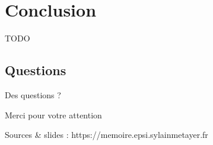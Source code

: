 \section{Conclusion}
\begin{frame}{\secname}
TODO
\end{frame}

\subsection{Questions}
\begin{frame}{Des questions ?}

Merci pour votre attention

Sources \& slides : https://memoire.epsi.sylainmetayer.fr

\end{frame}
